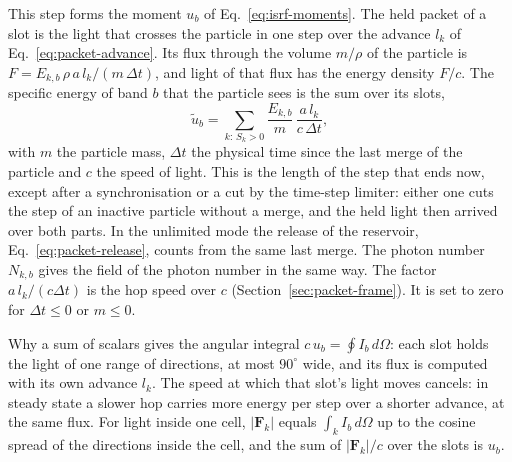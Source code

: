 This step forms the moment $u_b$ of Eq.~\eqref{eq:isrf-moments}. The held
packet of a slot is the light that crosses the particle in one step over the
advance $l_{k}$ of Eq.~\eqref{eq:packet-advance}. Its flux through the volume
$m/\rho$ of the particle is $F=E_{k,b}\,\rho\,a\,l_k/(m\,\Delta t)$, and light of
that flux has the energy density $F/c$. The specific energy of band $b$ that
the particle sees is the sum over its slots,
\begin{equation}
  \tilde u_{b} = \sum_{k:\,S_k>0} \frac{E_{k,b}}{m}\,\frac{a\,l_k}{c\,\Delta t},
  \label{eq:packet-field}
\end{equation}
with $m$ the particle mass, $\Delta t$ the physical time since the last merge
of the particle and $c$ the speed of light. This is the length of the step that
ends now, except after a synchronisation or a cut by the time-step limiter:
either one cuts the step of an inactive particle without a merge, and the held
light then arrived over both parts.
In the unlimited mode the release of the reservoir,
Eq.~\eqref{eq:packet-release}, counts from the same last merge.
The photon number $N_{k,b}$ gives the field of the photon number in the same
way. The factor $a\,l_k/(c\Delta t)$ is
the hop speed over $c$ (Section~\ref{sec:packet-frame}). It is set to zero for
$\Delta t\le0$ or $m\le0$.

Why a sum of scalars gives the angular integral $c\,u_b=\oint I_b\,d\Omega$:
each slot holds the light of one range of directions, at most $90^\circ$ wide,
and its flux is computed with its own advance $l_k$. The speed at which that
slot's light moves cancels: in steady state a slower hop carries more energy
per step over a shorter advance, at the same flux. For light inside one cell,
$|\boldsymbol F_k|$ equals $\int_k I_b\,d\Omega$ up to the cosine spread of
the directions inside the cell, and the sum of $|\boldsymbol F_k|/c$ over the
slots is $u_b$.

